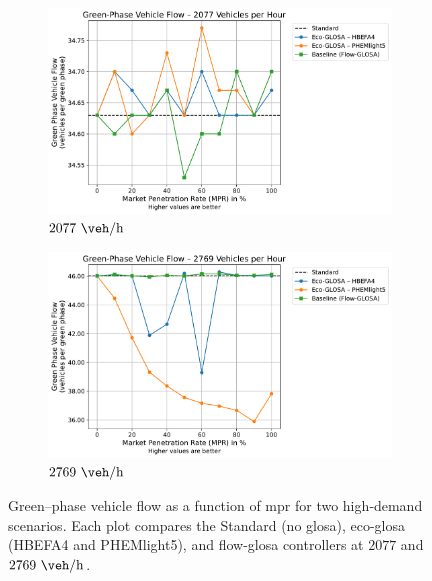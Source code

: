 \begin{figure}[htbp]
  \centering
  \begin{subfigure}[t]{0.98\textwidth}
    \includegraphics[width=\textwidth]{data/img/GreenPhaseVehicleFlow/GreenPhaseVehicleFlow_Cars1500.pdf}
    \caption{$2077~\unit{\veh\per\hour}$}
    \label{fig:flow_2077}
  \end{subfigure}\hfill
  \begin{subfigure}[t]{0.98\textwidth}
    \includegraphics[width=\textwidth]{data/img/GreenPhaseVehicleFlow/GreenPhaseVehicleFlow_Cars2000.pdf}
    \caption{$2769~\unit{\veh\per\hour}$}
    \label{fig:flow_2769}
  \end{subfigure}
  \caption[Green–phase vehicle flow vs. \ac{mpr} at $2077$ and $2769~\unit{\veh\per\hour}$]{%
    Green–phase vehicle flow as a function of \ac{mpr} for two high‐demand scenarios. Each plot compares the Standard (no \ac{glosa}), \ac{eco-glosa} (HBEFA4 and PHEMlight5), and \ac{flow-glosa} controllers at $2077$ and $2769~\unit{\veh\per\hour}$.%
  }
  \label{fig:combined_flow}
\end{figure}


